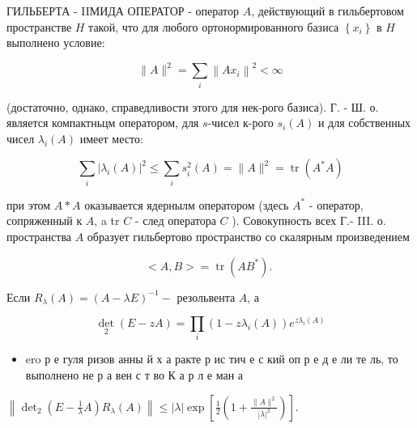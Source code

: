 \documentclass[10pt]{article}
\begin{document}
ГИЛЬБЕРТА - IIМИДА ОПЕРАТОР - оператор $A$, действующий в гильбертовом пространстве $H$ такой, что для любого ортонормированного базиса $\left\{x_{i}\right\}$ в $H$ выполнено условие:



\[

\|A\|^{2}=\sum_{i}\left\|A x_{i}\right\|^{2}<\infty

\]



(достаточно, однако, справедливости этого для нек-рого базиса). Г. - Ш. о. является компактньцм оператором, для $s$-чисел к-рого $s_{i}(A)$ и для собственных чисел $\lambda_{i}(A)$ имеет место:



\[

\sum_{i}\left|\lambda_{i}(A)\right|^{2} \leqslant \sum_{i} s_{i}^{2}(A)=\|A\|^{2}=\operatorname{tr}\left(A^{*} A\right)

\]



при этом $A * A$ оказывается ядернылм оператором (здесь $A^{*}$ - оператор, сопряженный к $A$, a tr $C$ - след оператора $C$ ). Совокупность всех Г.- III. о. пространства $A$ образует гильбертово пространство со скалярным произведением



\[

<A, B>=\operatorname{tr}\left(A B^{*}\right) \text {. }

\]



Если $R_{\lambda}(A)=(A-\lambda E)^{-1}-$ резольвента $A$, а



\[

\operatorname{det}_{2}(E-z A)=\prod_{i}\left(1-z \lambda_{i}(A)\right) e^{z \lambda_{i}(A)}

\]



\begin{itemize}

  \item ero р е гуля ризов анны й х а ракте р ис тич е с кий оп р е д е ли те ль, то выполнено не р а вен с т во К а р л е ман а

\end{itemize}



$\left\|\operatorname{det}_{2}\left(E-\frac{1}{\lambda} A\right) R_{\lambda}(A)\right\| \leqslant|\lambda| \exp \left[\frac{1}{2}\left(1+\frac{\|A\|^{2}}{|\lambda|^{2}}\right)\right]$.
\end{document}
